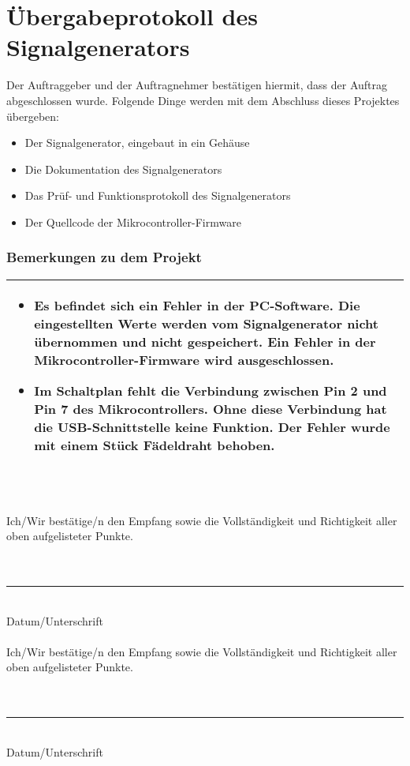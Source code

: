 \section[Übergabeprotokoll]{Übergabeprotokoll des Signalgenerators}
\bigskip
Der Auftraggeber und der Auftragnehmer bestätigen hiermit, dass der Auftrag abgeschlossen wurde. Folgende Dinge werden mit dem Abschluss dieses Projektes übergeben:
\begin{itemize}
\item Der Signalgenerator, eingebaut in ein Gehäuse
\item Die Dokumentation des Signalgenerators
\item Das Prüf- und Funktionsprotokoll des Signalgenerators
\item Der Quellcode der Mikrocontroller-Firmware
\end{itemize}
\bigskip
\subsubsection*{Bemerkungen zu dem Projekt}

\begin{tabular}{|p{\textwidth}|}
\hline
\begin{itemize}
\item Es befindet sich ein Fehler in der PC-Software. Die eingestellten Werte werden vom Signalgenerator nicht übernommen und nicht gespeichert. Ein Fehler in der Mikrocontroller-Firmware wird ausgeschlossen.
\item Im Schaltplan fehlt die Verbindung zwischen Pin 2 und Pin 7 des Mikrocontrollers. Ohne diese Verbindung hat die USB-Schnittstelle keine Funktion. Der Fehler wurde mit einem Stück Fädeldraht behoben.
\end{itemize}
~\\
\hline
\end{tabular}

\bigskip
\bigskip
Ich/Wir bestätige/n den Empfang sowie die Vollständigkeit und Richtigkeit aller oben aufgelisteter Punkte.\\
\bigskip \\
\bigskip \\
\rule{5cm}{0.5mm}\\
Datum/Unterschrift\\
\bigskip \\
Ich/Wir bestätige/n den Empfang sowie die Vollständigkeit und Richtigkeit aller oben aufgelisteter Punkte.\\
\bigskip \\
\bigskip \\
\rule{5cm}{0.5mm}~\\
Datum/Unterschrift
